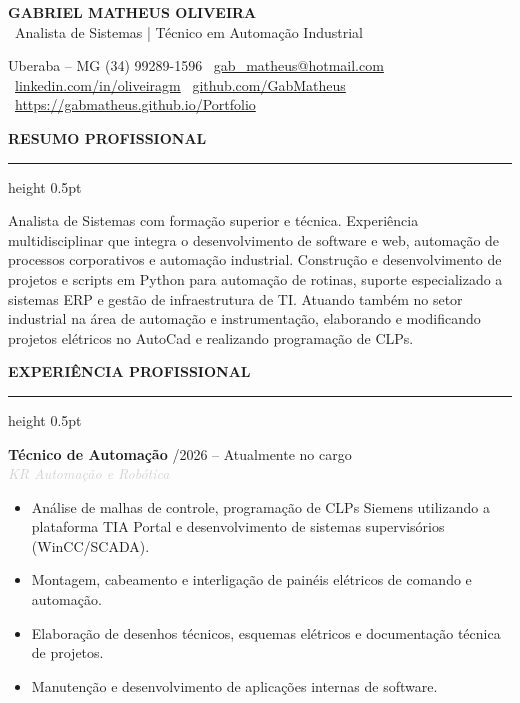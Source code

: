 \documentclass[10pt,a4paper]{article}
\newcommand{\cvsection}[1]{
    \vspace{12pt}
    {\large\textcolor{sectcol}{\textbf{\MakeUppercase{#1}}}}
    \vspace{2pt}
    \hrule height 0.5pt \relax
    \vspace{6pt}
}
\newcommand{\cvevent}[4]{
    \noindent \textbf{#2} \hfill \textcolor{sectcol}{\small \faCalendar* #1} \\
    \noindent \textit{\textcolor{lightgray}{#3}} \vspace{4pt} \\
    {#4} \vspace{8pt}
}
\begin{document}
\begin{center}
    {\Huge \textbf{GABRIEL MATHEUS OLIVEIRA}} \\
    \vspace{6pt}
    {\color{sectcol} \large \faCode \ Analista de Sistemas | Técnico em Automação Industrial} \\
    \vspace{10pt}
    
    \small
    \faMapMarker* Uberaba -- MG \quad 
    \faPhone* (34) 99289-1596 \quad 
    \faEnvelope \ \href{mailto:gab_matheus@hotmail.com}{gab\_matheus@hotmail.com} \\
    \vspace{4pt}
    \faLinkedin \ \href{https://linkedin.com/in/oliveiragm}{linkedin.com/in/oliveiragm} \quad 
    \faGithub \ \href{https://github.com/GabMatheus}{github.com/GabMatheus} \quad 
    \faGlobe \ \href{https://gabmatheus.github.io/Portfolio/}{https://gabmatheus.github.io/Portfolio}
\end{center}

\cvsection{Resumo Profissional}
Analista de Sistemas com formação superior e técnica. Experiência multidisciplinar que integra o desenvolvimento de software e web, automação de processos corporativos e automação industrial. Construção e desenvolvimento de projetos e scripts em Python para automação de rotinas, suporte especializado a sistemas ERP e gestão de infraestrutura de TI. Atuando também no setor industrial na área de automação e instrumentação, elaborando e modificando projetos elétricos no AutoCad e realizando programação de CLPs.

\cvsection{Experiência Profissional}
\cvevent{03/2026 – Atualmente no cargo}{Técnico de Automação}{KR Automação e Robótica}{
\begin{itemize}
    \item Análise de malhas de controle, programação de CLPs Siemens utilizando a plataforma TIA Portal e desenvolvimento de sistemas supervisórios (WinCC/SCADA).
    \item Montagem, cabeamento e interligação de painéis elétricos de comando e automação.
    \item Elaboração de desenhos técnicos, esquemas elétricos e documentação técnica de projetos.
    \item Manutenção e desenvolvimento de aplicações internas de software.
\end{itemize}
}
\end{document}
